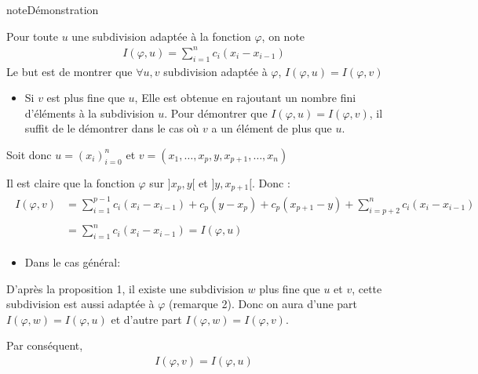 \documentclass[letterpaper,10pt,french]{sphinxmanual}
\begin{document}
\begin{sphinxadmonition}{note}{Démonstration}

\sphinxAtStartPar
Pour toute \(u\) une subdivision adaptée à la fonction \(\varphi\), on note
\begin{equation*}
\begin{split}
I(\varphi, u)= \sum_{i=1}^nc_i(x_i-x_{i-1})
\end{split}
\end{equation*}
\sphinxAtStartPar
Le but est de montrer que \(\forall u, v\) subdivision adaptée à \(\varphi\), \(I(\varphi, u)=I(\varphi, v)\)
\begin{itemize}
\item {} 
\sphinxAtStartPar
Si \(v\) est plus fine que \(u\),
Elle est obtenue en rajoutant un nombre fini d’éléments à la subdivision \(u\). Pour démontrer que \(I(\varphi, u)=I(\varphi, v)\), il suffit de le démontrer dans le cas où  \(v\) a un élément de plus que \(u\).

\end{itemize}

\sphinxAtStartPar
Soit donc \(u=(x_i)_{i=0}^n\) et \(v=(x_1, \ldots, x_p, y, x_{p+1}, \ldots, x_n)\)

\sphinxAtStartPar
Il est claire que la fonction \(\varphi\) sur \(]x_p, y[\) et \(]y, x_{p+1}[\). Donc :
\begin{equation*}
\begin{split}
\begin{aligned}
I(\varphi, v) & =  \sum_{i=1}^{p-1}c_i(x_i-x_{i-1})+c_p(y-x_p) + c_p(x_{p+1}-y) + \sum_{i=p+2}^{n}c_i(x_i-x_{i-1})  \\ \\
 & =  \sum_{i=1}^{n}c_i(x_i-x_{i-1}) = I(\varphi, u) 
\end{aligned}
\end{split}
\end{equation*}\begin{itemize}
\item {} 
\sphinxAtStartPar
Dans le cas général:

\end{itemize}

\sphinxAtStartPar
D’après la proposition 1, il existe une subdivision \(w\) plus fine que \(u\) et \(v\), cette subdivision est aussi adaptée à \(\varphi\) (remarque 2).
Donc on aura d’une part \(I(\varphi, w)=I(\varphi, u)\) et d’autre part \(I(\varphi, w)=I(\varphi, v)\).

\sphinxAtStartPar
Par conséquent,
\begin{equation*}
\begin{split}
I(\varphi, v)=I(\varphi, u)
\end{split}
\end{equation*}\end{sphinxadmonition}
\end{document}
